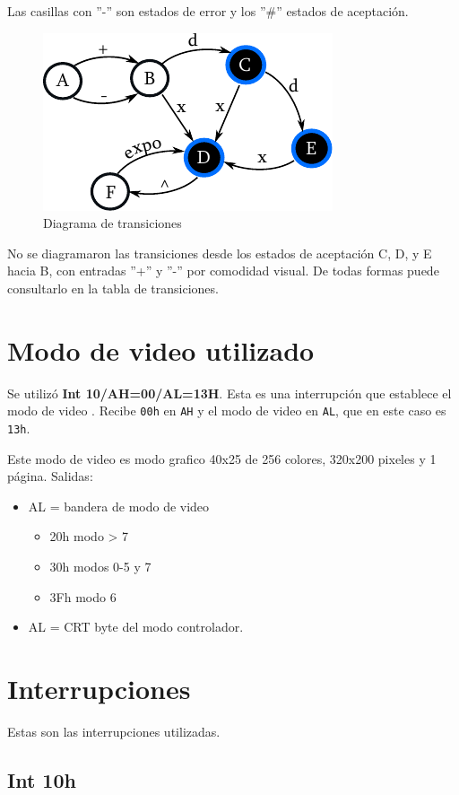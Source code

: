 \documentclass[journal]{../../IEEEtran/IEEEtran}
\begin{document}
Las casillas con ''-'' son estados de error y los ''\#'' estados de aceptación.

\begin{figure}[H]
  \centering
  \caption{Diagrama de transiciones}
  \includegraphics{grafo.pdf}
\end{figure}

No se diagramaron las transiciones desde los estados de aceptación C,
D, y E hacia B, con entradas ''+'' y ''-'' por comodidad visual. De
todas formas puede consultarlo en la tabla de transiciones.

\section{Modo de video utilizado}
Se utilizó \textbf{Int 10/AH=00/AL=13H}. Esta es una interrupción que
establece el modo de video \cite{int10_00_13}. Recibe \verb|00h| en
\verb|AH| y el modo de video en \verb|AL|, que en este caso es
\verb|13h|.

Este modo de video es modo grafico 40x25 de 256 colores, 320x200
pixeles y 1 página. Salidas:

\begin{itemize}
\item AL = bandera de modo de video
  \begin{itemize}
  \item 20h modo > 7
  \item 30h modos 0-5 y 7
  \item 3Fh modo 6
  \end{itemize}
\item AL = CRT byte del modo controlador.
\end{itemize}

\section{Interrupciones}
Estas son las interrupciones utilizadas.

\subsection{Int 10h}
\end{document}
